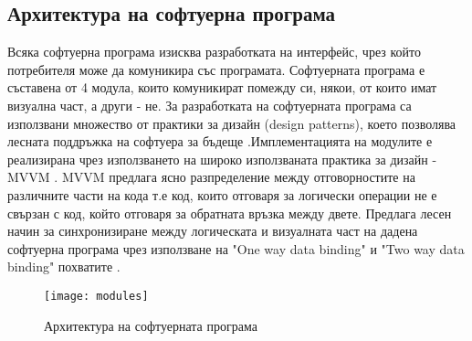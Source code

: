 \subsection{Архитектура на софтуерна програма}
Всяка софтуерна програма изисква разработката на интерфейс, чрез който потребителя може да комуникира със програмата. Софтуерната програма е съставена от 4 модула, които комуникират помежду си, някои, от които имат визуална част, а други - не.
За разработката на софтуерната програма са използвани множество от практики за дизайн (design patterns), което позволява лесната поддръжка на софтуера за бъдеще \cite{patterns}.Имплементацията на модулите е реализирана чрез използването на широко използваната практика за дизайн - MVVM \cite{mvvm}. MVVM предлага ясно разпределение между отговорностите на различните части на кода т.е код, които отговаря за логически операции не е свързан с код, който отговаря за обратната връзка между двете. Предлага лесен начин за синхронизиране между логическата и визуалната част на дадена софтуерна програма чрез използване на "One way data binding" и "Two way data binding" похватите \cite{dataBinding}.

\begin{figure}
    \centerline{\texttt{[image: modules]}}
    \caption{Архитектура на софтуерната програма}
    \label{fig:architecture}
\end{figure}

